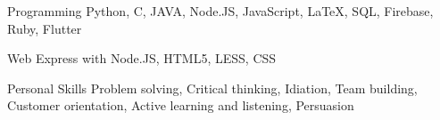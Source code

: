 


\begin{cvskills}


\cvskill
{Programming} %
{Python, C, JAVA, Node.JS, JavaScript, LaTeX, SQL, Firebase, Ruby, Flutter} %


\cvskill
{Web} %
{Express with Node.JS, HTML5, LESS, CSS} %


\cvskill
{Personal Skills} %
{Problem solving, Critical thinking, Idiation, Team building, Customer orientation, Active learning and listening, Persuasion} %


\end{cvskills}